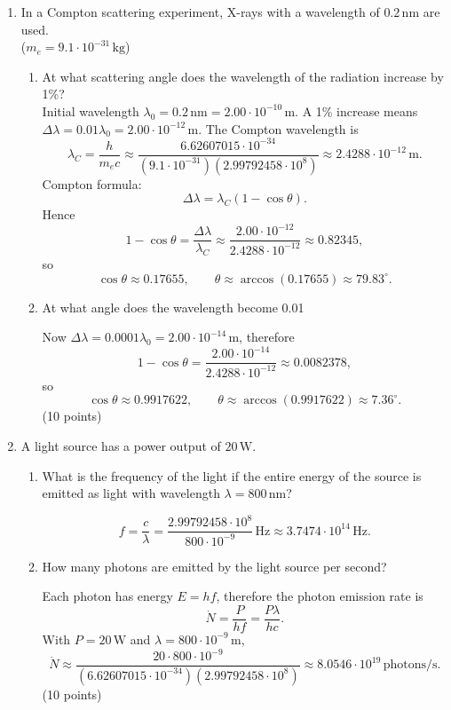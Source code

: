 \documentclass[12pt]{letter}
\begin{document}
\begin{enumerate}
\bigskip
\item In a Compton scattering experiment, X-rays with a wavelength of $0.2\,\text{nm}$ are used.\\
($m_e=9.1\cdot10^{-31}\,\text{kg}$)
\begin{enumerate}
\item At what scattering angle does the wavelength of the radiation increase by 1\%?\\

Initial wavelength $\lambda_0=0.2\,\text{nm}=2.00\cdot10^{-10}\,\text{m}$. A 1\% increase means  $\Delta\lambda=0.01\lambda_0=2.00\cdot10^{-12}\,\text{m}.$
The Compton wavelength is
$$ \lambda_C=\frac{h}{m_e c}\approx \frac{6.62607015\cdot10^{-34}}{(9.1\cdot10^{-31})(2.99792458\cdot10^{8})}
\approx 2.4288\cdot10^{-12}\,\text{m}. $$
Compton formula:
$$ \Delta\lambda=\lambda_C(1-\cos\theta). $$
Hence
$$ 1-\cos\theta=\frac{\Delta\lambda}{\lambda_C}\approx\frac{2.00\cdot10^{-12}}{2.4288\cdot10^{-12}}\approx 0.82345, $$
so
$$ \cos\theta \approx 0.17655,\qquad \theta\approx \arccos(0.17655)\approx 79.83^{\circ}. $$

\item At what angle does the wavelength become 0.01%

Now $\Delta\lambda=0.0001\lambda_0=2.00\cdot10^{-14}\,\text{m}$, therefore
$$ 1-\cos\theta=\frac{2.00\cdot10^{-14}}{2.4288\cdot10^{-12}}\approx 0.0082378, $$
so
$$ \cos\theta \approx 0.9917622,\qquad \theta\approx \arccos(0.9917622)\approx 7.36^\circ. $$
\hfill (10 points)
\end{enumerate}

\bigskip
\item A light source has a power output of $20\,\text{W}$.

\begin{enumerate}
\item What is the frequency of the light if the entire energy of the source is emitted as light with
wavelength $\lambda = 800\,\text{nm}$?\

$$ f=\frac{c}{\lambda}=\frac{2.99792458\cdot10^{8}}{800\cdot10^{-9}}\,\text{Hz}\approx 3.7474\cdot10^{14}\,\text{Hz}. $$

\item  How many photons are emitted by the light source per second?\

Each photon has energy $E=hf$, therefore the photon emission rate is
$$ \dot{N}=\frac{P}{hf}=\frac{P\lambda}{hc}.$$
With $P=20\,\text{W}$ and $\lambda=800\cdot10^{-9}\,\text{m}$,
$$ \dot{N}\approx \frac{20\cdot 800\cdot10^{-9}}{(6.62607015\cdot10^{-34})(2.99792458\cdot10^{8})}
\approx 8.0546\cdot10^{19}\,\text{photons/s}. $$
\hfill (10 points)
\end{enumerate}


\end{enumerate}
\end{document}
